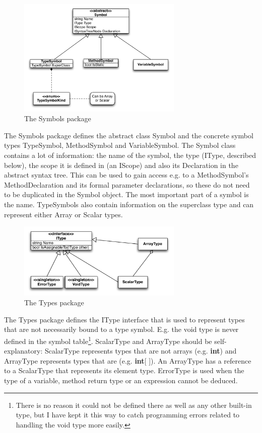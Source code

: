 \documentclass[a4paper,11pt]{article}
\begin{document}
\begin{figure}[h!]
\centering
\includegraphics[width=0.7\textwidth]{symbols.pdf}
\caption{The Symbols package}
\end{figure}

The Symbols package defines the abstract class Symbol and the concrete symbol types TypeSymbol, MethodSymbol and VariableSymbol. The Symbol class contains a lot of information: the name of the symbol, the type (IType, described below), the scope it is defined in (an IScope) and also its Declaration in the abstract syntax tree. This can be used to gain access e.g. to a MethodSymbol's MethodDeclaration and its formal parameter declarations, so these do not need to be duplicated in the Symbol object. The most important part of a symbol is the name. TypeSymbols also contain information on the superclass type and can represent either Array or Scalar types.

\begin{figure}[h!]
\centering
\includegraphics[width=0.7\textwidth]{types.pdf}
\caption{The Types package}
\end{figure}

The Types package defines the IType interface that is used to represent types that are not necessarily bound to a type symbol. E.g. the void type is never defined in the symbol table\footnote{There is no reason it could not be defined there as well as any other built-in type, but I have kept it this way to catch programming errors related to handling the void type more easily.}. ScalarType and ArrayType should be self-explanatory: ScalarType represents types that are not arrays (e.g. \textbf{int}) and ArrayType represents types that are (e.g. \textbf{int}[ ]). An ArrayType has a reference to a ScalarType that represents its element type. ErrorType is used when the type of a variable, method return type or an expression cannot be deduced.
\end{document}
